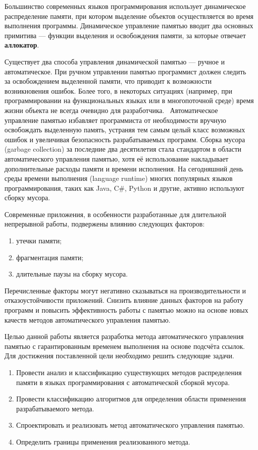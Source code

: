 Большинство современных языков программирования использует динамическое распределение памяти, при котором выделение объектов осуществляется во время выполнения программы. Динамическое управление памятью вводит два основных примитива --- функции выделения и освобождения памяти, за которые отвечает \textbf{аллокатор}. 

Существует два способа управления динамической памятью --- ручное и автоматическое. При ручном управлении памятью программист должен следить за освобождением выделенной памяти, что приводит к возможности возникновения ошибок. Более того, в некоторых ситуациях (например, при программировании на функциональных языках или в многопоточной среде) время жизни объекта не всегда очевидно для разработчика.~\cite{elixir} Автоматическое управление памятью избавляет программиста от необходимости вручную освобождать выделенную память, устраняя тем самым целый класс возможных ошибок и увеличивая безопасность разрабатываемых программ. Сборка мусора (garbage collection) за последние два десятилетия стала стандартом в области автоматического управления памятью, хотя её использование накладывает дополнительные расходы памяти и времени исполнения. На сегодняшний день среды времени выполнения (language runtime) многих популярных языков программирования, таких как Java, C\#, Python и другие, активно используют сборку мусора. 

Современные приложения, в особенности разработанные для длительной непрерывной работы, подвержены влиянию следующих факторов: 
\begin{enumerate}[label*=\arabic*)]
	\item утечки памяти;
	\item фрагментация памяти;
	\item длительные паузы на сборку мусора.
\end{enumerate}
Перечисленные факторы могут негативно сказываться на производительности и отказоустойчивости приложений. Снизить влияние данных факторов на работу программ и повысить эффективность работы с памятью можно на основе новых качеств методов автоматического управления памятью.

Целью данной работы является разработка метода автоматического управления памятью с гарантированным временем выполнения на основе подсчёта ссылок. Для достижения поставленной цели необходимо решить следующие задачи.

\begin{enumerate}[label*=\arabic*.]
	\item Провести анализ и классификацию существующих методов распределения памяти в языках программирования с автоматической сборкой мусора.
	\item Провести классификацию алгоритмов для определения области применения разрабатываемого метода.
	\item Спроектировать и реализовать метод автоматического управления памятью.
	\item Определить границы применения реализованного метода. 
\end{enumerate}
